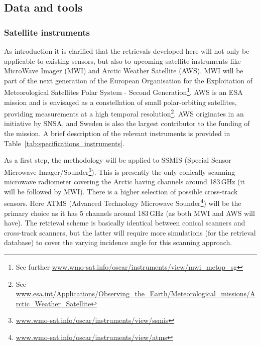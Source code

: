 \documentclass[12pt,oneside,a4paper]{article}
\begin{document}
\newpage
\subsection{Data and tools}
% 
\subsubsection{Satellite instruments}

As introduction it is clarified that the retrievals developed here will not only be applicable to existing sensors, but also to upcoming satellite
instruments like MicroWave Imager (MWI) and Arctic Weather Satellite (AWS). MWI will be part of the next generation of the European Organisation for the
Exploitation of Meteorological Satellites Polar System - Second
Generation\footnote{See further
  \url{www.wmo-sat.info/oscar/instruments/view/mwi_metop_sg}}. AWS is an ESA mission and is envisaged as a constellation of small polar-orbiting satellites, providing measurements at a high temporal resolution\footnote{See
  \url{www.esa.int/Applications/Observing_the_Earth/Meteorological_missions/Arctic_Weather_Satellite}}.
AWS originates in an initiative by SNSA, and Sweden is also the largest
contributor to the funding of the mission. A brief description of the relevant instruments is provided in Table~\ref{tab:specifications_instruments}.

As a first step, the methodology will be applied to SSMIS (Special Sensor
Microwave Imager/Sounder\footnote{\url{www.wmo-sat.info/oscar/instruments/view/ssmis}}). This is presently the only conically scanning
microwave radiometer covering the Arctic having channels around 183\,GHz (it
will be followed by MWI). There is a higher selection of possible cross-track sensors. Here ATMS (Advanced Technology Microwave Sounder\footnote{\url{www.wmo-sat.info/oscar/instruments/view/atms}}) will be the primary choice as it has 5 channels around 183\,GHz (as both MWI and AWS will have). The retrieval scheme is basically identical between conical scanners and cross-track scanners, but the latter will require more simulations (for the retrieval database) to cover the varying incidence angle for this scanning approach.
\end{document}
